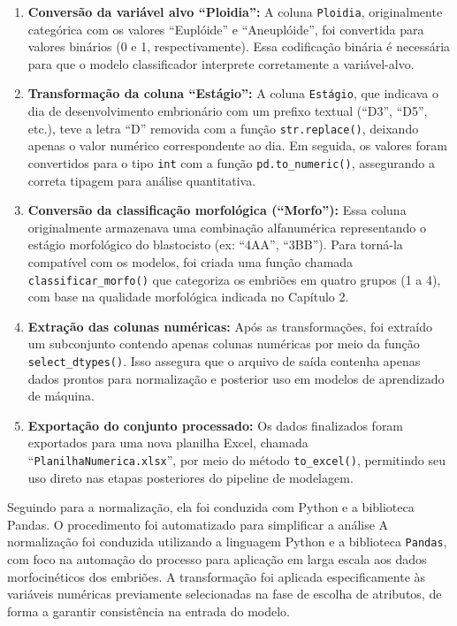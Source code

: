 \begin{enumerate}
    \item \textbf{Conversão da variável alvo “Ploidia”:} A coluna \texttt{Ploidia}, originalmente categórica com os valores “Euplóide” e “Aneuplóide”, foi convertida para valores binários (0 e 1, respectivamente). Essa codificação binária é necessária para que o modelo classificador interprete corretamente a variável-alvo.
    
    \item \textbf{Transformação da coluna “Estágio”:} A coluna \texttt{Estágio}, que indicava o dia de desenvolvimento embrionário com um prefixo textual (“D3”, “D5”, etc.), teve a letra “D” removida com a função \texttt{str.replace()}, deixando apenas o valor numérico correspondente ao dia. Em seguida, os valores foram convertidos para o tipo \texttt{int} com a função \texttt{pd.to\_numeric()}, assegurando a correta tipagem para análise quantitativa.
    
    \item \textbf{Conversão da classificação morfológica (“Morfo”):} Essa coluna originalmente armazenava uma combinação alfanumérica representando o estágio morfológico do blastocisto (ex: “4AA”, “3BB”). Para torná-la compatível com os modelos, foi criada uma função chamada \texttt{classificar\_morfo()} que categoriza os embriões em quatro grupos (1 a 4), com base na qualidade morfológica indicada no Capítulo 2.
    
    \item \textbf{Extração das colunas numéricas:} Após as transformações, foi extraído um subconjunto contendo apenas colunas numéricas por meio da função \texttt{select\_dtypes()}. Isso assegura que o arquivo de saída contenha apenas dados prontos para normalização e posterior uso em modelos de aprendizado de máquina.
    
    \item \textbf{Exportação do conjunto processado:} Os dados finalizados foram exportados para uma nova planilha Excel, chamada “\texttt{PlanilhaNumerica.xlsx}”, por meio do método \texttt{to\_excel()}, permitindo seu uso direto nas etapas posteriores do pipeline de modelagem.
\end{enumerate}

Seguindo para a normalização, ela foi conduzida com Python e a biblioteca Pandas. O procedimento foi automatizado para simplificar a análise A normalização foi conduzida utilizando a linguagem Python e a biblioteca \texttt{Pandas}, com foco na automação do processo para aplicação em larga escala aos dados morfocinéticos dos embriões. A transformação foi aplicada especificamente às variáveis numéricas previamente selecionadas na fase de escolha de atributos, de forma a garantir consistência na entrada do modelo.

